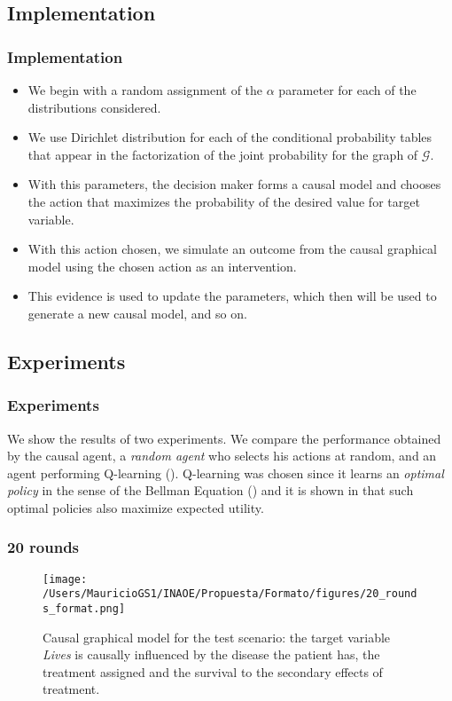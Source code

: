 \documentclass{beamer}
\theoremstyle{plain}
\begin{document}
\subsection{Implementation}
\begin{frame}
\frametitle{Implementation}
\begin{itemize}
\item We begin with a random assignment of the $\alpha$ parameter for each of the distributions considered.
\item  We use Dirichlet distribution for each of the conditional probability tables that appear in the factorization of the joint probability for the graph of $\mathcal{G}$.
\item With this parameters, the decision maker forms a causal model and chooses the action that maximizes the probability of the desired value for target variable.
\item With this action chosen, we simulate an outcome from the causal graphical model using the chosen action as an intervention.
\item This evidence is used to update the parameters, which then will be used to generate a new causal model, and so on.
\end{itemize}
\end{frame}

\subsection{Experiments}
\begin{frame}
\frametitle{Experiments}
We show the results of two experiments. We compare the performance obtained by the causal agent, a \textit{random agent} who selects his actions at random, and an agent performing Q-learning (\cite{watkins1992q}). Q-learning was chosen since it learns an \textit{optimal policy} in the sense of the Bellman Equation (\cite{sutton1998reinforcement}) and it is shown in \cite{webb2007game} that such optimal policies also maximize expected utility. 
\end{frame}

\begin{frame}
\frametitle{20 rounds}
\begin{figure}[ht]
\vskip 0.2in
\begin{center}
\texttt{[image: /Users/MauricioGS1/INAOE/Propuesta/Formato/figures/20\_rounds\_format.png]}
\caption{Causal graphical model for the test scenario: the target variable \textit{Lives} is causally influenced by the disease the patient has, the treatment assigned and the survival to the secondary effects of treatment.}
\label{causal_model}
\end{center}
\vskip -0.2in
\end{figure}
\end{frame}
\end{document}
